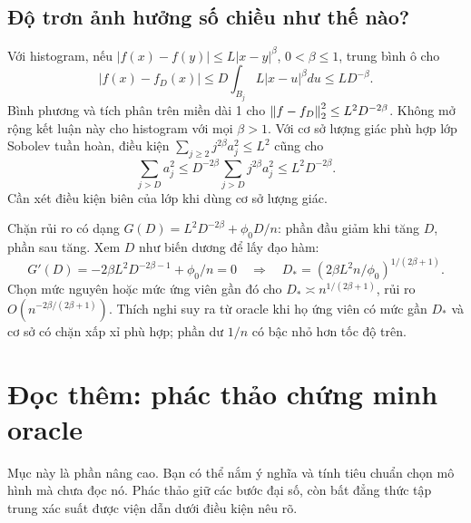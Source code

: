 \subsection{Độ trơn ảnh hưởng số chiều như thế nào?}
Với histogram, nếu $|f(x)-f(y)|\leq L|x-y|^\beta$,
$0<\beta\leq1$, trung bình ô cho
\[
|f(x)-f_D(x)|
\leq D\int_{B_j}L|x-u|^\beta du\leq LD^{-\beta}.
\]
Bình phương và tích phân trên miền dài 1 cho
$\left\lVert f-f_D\right\rVert_2^2\leq L^2D^{-2\beta}$.
Không mở rộng kết luận này cho histogram với mọi $\beta>1$.
Với cơ sở lượng giác phù hợp lớp Sobolev tuần hoàn, điều kiện
$\sum_{j\geq2}j^{2\beta}a_j^2\leq L^2$ cũng cho
\[
\sum_{j>D}a_j^2\leq D^{-2\beta}\sum_{j>D}j^{2\beta}a_j^2
\leq L^2D^{-2\beta}.
\]
Cần xét điều kiện biên của lớp khi dùng cơ sở lượng giác.

Chặn rủi ro có dạng $G(D)=L^2D^{-2\beta}+\phi_0D/n$:
phần đầu giảm khi tăng $D$, phần sau tăng. Xem $D$ như biến dương để
lấy đạo hàm:
\[
G'(D)=-2\beta L^2D^{-2\beta-1}+\phi_0/n=0
\quad\Longrightarrow\quad
D_*=(2\beta L^2n/\phi_0)^{1/(2\beta+1)}.
\]
Chọn mức nguyên hoặc mức ứng viên gần đó cho
$D_*\asymp n^{1/(2\beta+1)}$, rủi ro
$O(n^{-2\beta/(2\beta+1)})$.
Thích nghi suy ra từ oracle khi họ ứng viên có mức gần $D_*$ và cơ sở
có chặn xấp xỉ phù hợp; phần dư $1/n$ có bậc nhỏ hơn tốc độ trên.

\section{Đọc thêm: phác thảo chứng minh oracle}
Mục này là phần nâng cao. Bạn có thể nắm ý nghĩa và tính tiêu chuẩn
chọn mô hình mà chưa đọc nó. Phác thảo giữ các bước đại số, còn bất đẳng
thức tập trung xác suất được viện dẫn dưới điều kiện nêu rõ.

